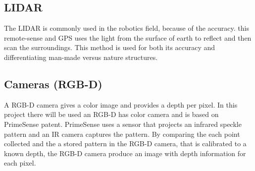 \subsection{LIDAR}
The LIDAR is commonly used in the robotics field, because of the accuracy. this remote-sense and GPS uses the light from the surface of earth to reflect and then scan the surroundings. This method is used for both its accuracy and differentiating man-made versus nature structures\cite{LIDAR}.

\subsection{Cameras (RGB-D)} \label{ch:CameraRGB}



A RGB-D camera gives a color image and provides a depth per pixel. In this project there will be used an RGB-D has color camera and is based on PrimeSense patent.  
PrimeSense uses a sensor that projects an infrared speckle pattern and an IR camera captures the pattern. 
By comparing the each point collected and the a stored pattern in the RGB-D camera, that is calibrated to a known depth, the RGB-D camera produce an image with depth information for each pixel\cite{RGB-D-new}.



